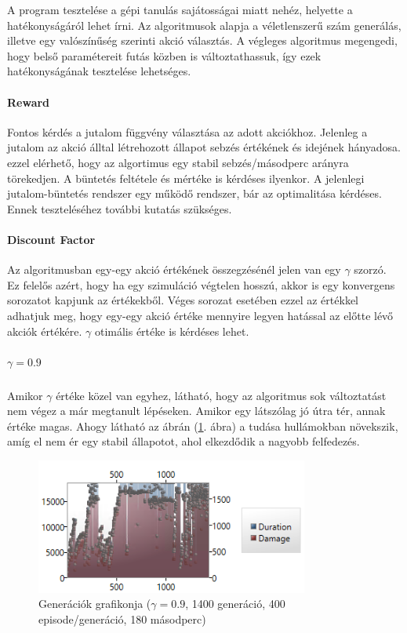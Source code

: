 \documentclass[12pt]{article}
\begin{document}
	A program tesztelése a gépi tanulás sajátosságai miatt nehéz, helyette a hatékonyságáról lehet írni. Az algoritmusok alapja a véletlenszerű szám generálás, illetve egy valószínűség szerinti akció választás. A végleges algoritmus megengedi, hogy belső paramétereit futás közben is változtathassuk, így ezek hatékonyságának tesztelése lehetséges.
	
	\paragraph{Reward} Fontos kérdés a jutalom függvény választása az adott akciókhoz. Jelenleg a jutalom az akció álltal létrehozott állapot sebzés értékének és idejének hányadosa. ezzel elérhető, hogy az algortimus egy stabil sebzés/másodperc arányra törekedjen. A büntetés feltétele és mértéke is kérdéses ilyenkor. A jelenlegi jutalom-büntetés rendszer egy működő rendszer, bár az optimalitása kérdéses. Ennek teszteléséhez további kutatás szükséges.
	
	\paragraph{Discount Factor} Az algoritmusban egy-egy akció értékének összegzésénél jelen van egy $\gamma$ szorzó. Ez felelős azért, hogy ha egy szimuláció végtelen hosszú, akkor is egy konvergens sorozatot kapjunk az értékekből. Véges sorozat esetében ezzel az értékkel adhatjuk meg, hogy egy-egy akció értéke mennyire legyen hatással az előtte lévő akciók értékére. $\gamma$ otimális értéke is kérdéses lehet.
	
	\subparagraph{$\gamma = 0.9$}
	
	Amikor $\gamma$ értéke közel van egyhez, látható, hogy az algoritmus sok változtatást nem végez a már megtanult lépéseken. Amikor egy látszólag jó útra tér, annak értéke magas. Ahogy látható az ábrán (\ref{fig:19gamma1400gen400ep1800dur}. ábra) a tudása hullámokban növekszik, amíg el nem ér egy stabil állapotot, ahol elkezdődik a nagyobb felfedezés.
	
	\begin{figure}[H]
		\begin{center}
			\includegraphics[width=0.8\textwidth]{19gamma1400gen400ep1800dur}
		\end{center}
		\caption{Generációk grafikonja ($\gamma = 0.9$, 1400 generáció, 400 episode/generáció, 180 másodperc)}
		\label{fig:19gamma1400gen400ep1800dur}
	\end{figure}
	
\end{document}
